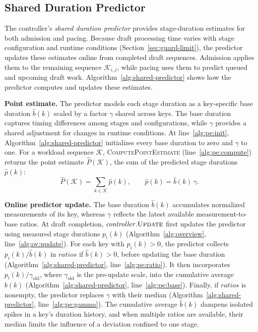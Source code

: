 \subsection{Shared Duration Predictor}
\label{sec:model}
The controller's \emph{shared duration predictor} provides stage-duration estimates for both admission and pacing.
Because draft processing time varies with stage configuration and runtime conditions (Section~\ref{sec:guard-limit}), the predictor updates these estimates online from completed draft sequences.
Admission applies them to the remaining sequence \(\mathcal K_{i,j}\), while pacing uses them to predict queued and upcoming draft work.
Algorithm~\ref{alg:shared-predictor} shows how the predictor computes and updates these estimates.



\smallskip\noindent\textbf{Point estimate.}
The predictor models each stage duration as a key-specific base duration \(\hat b(k)\) scaled by a factor \(\gamma\) shared across keys.
The base duration captures timing differences among stages and configurations, while \(\gamma\) provides a shared adjustment for changes in runtime conditions.
At line~\ref{alg:pe:init}, Algorithm~\ref{alg:shared-predictor} initializes every base duration to zero and \(\gamma\) to one.
For a workload sequence \(\mathcal K\), \textsc{ComputePointEstimate} (line~\ref{alg:pe:compute}) returns the point estimate \(\hat P(\mathcal K)\), the sum of the predicted stage durations \(\hat p(k)\):
\begin{equation}
  \hat P(\mathcal{K})
  =\sum_{k\in\mathcal{K}}\hat p(k),
  \qquad
  \hat p(k)=\hat b(k)\,\gamma .
  \label{eq:point-estimate}
\end{equation}

\smallskip\noindent\textbf{Online predictor update.}
The base duration \(\hat b(k)\) accumulates normalized measurements of its key, whereas \(\gamma\) reflects the latest available measurement-to-base ratios.
At draft completion, \(\mathit{controller}.\textsc{Update}\) first updates the predictor using measured stage durations \(p_i(k)\) (Algorithm~\ref{alg:overview}, line~\ref{alg:ov:update}).
For each key with \(p_i(k)>0\), the predictor collects \(p_i(k)/\hat b(k)\) in \(\mathit{ratios}\) if \(\hat b(k)>0\), before updating the base duration (Algorithm~\ref{alg:shared-predictor}, line~\ref{alg:pe:ratio}).
It then incorporates \(p_i(k)/\gamma_{\mathrm{old}}\), where \(\gamma_{\mathrm{old}}\) is the pre-update scale, into the cumulative average \(\hat b(k)\) (Algorithm~\ref{alg:shared-predictor}, line~\ref{alg:pe:base}).
Finally, if \(\mathit{ratios}\) is nonempty, the predictor replaces \(\gamma\) with their median (Algorithm~\ref{alg:shared-predictor}, line~\ref{alg:pe:gamma}).
The cumulative average \(\hat b(k)\) dampens isolated spikes in a key's duration history, and when multiple ratios are available, their median limits the influence of a deviation confined to one stage.
